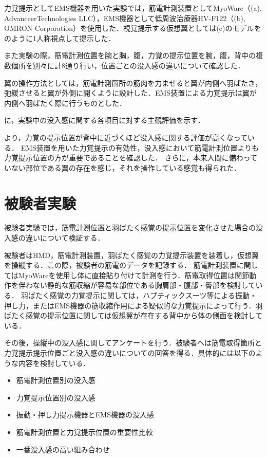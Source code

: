 
    力覚提示としてEMS機器を用いた実験では，筋電計測装置としてMyoWare（(a), AdvanceerTechnologies LLC），EMS機器として低周波治療器HV-F122（(b), OMRON Corporation）を使用した．視覚提示する仮想翼としては(c)のモデルをのように1人称視点して提示した．

    また実験の際，筋電計測位置を腕と胸，腹，力覚の提示位置を腕，腹，背中の複数個所を別々に計8通り行い，位置ごとの没入感の違いについて確認した．

    翼の操作方法としては，筋電計測箇所の筋肉を力ませると翼が内側へ羽ばたき，弛緩させると翼が外側に開くように設計した．EMS装置による力覚提示は翼が内側へ羽ばたく際に行うものとした．


    に，実験中の没入感に関する各項目に対する主観評価を示す．
    
    
    

    より，力覚の提示位置が背中に近づくほど没入感に関する評価が高くなっている．
    EMS装置を用いた力覚提示の有効性，没入感において筋電計測位置よりも力覚提示位置の方が重要であることを確認した．
    さらに，本来人間に備わっていない部位である翼の存在を感じ，それを操作している感覚も得られた．

\section{被験者実験}
    
    被験者実験では，筋電計測位置と羽ばたく感覚の提示位置を変化させた場合の没入感の違いについて検証する．
    
    被験者はHMD，筋電計測装置，羽ばたく感覚の力覚提示装置を装着し，仮想翼を操縦する．この際，被験者の筋電のデータを記録する．
    筋電計測装置に関してはMyoWareを使用し体に直接貼り付けて計測を行う．筋電取得位置は関節動作を伴わない静的な筋収縮が容易な部位である胸肩部・腹部・臀部を検討している．
    羽ばたく感覚の力覚提示に関しては，ハプティックスーツ等による振動・押し力，またはEMS機器の筋収縮作用による疑似的な力覚提示によって行う．羽ばたく感覚の提示位置に関しては仮想翼が存在する背中から体の側面を検討している．
    
    その後，操縦中の没入感に関してアンケートを行う．被験者へは筋電取得箇所と力覚提示提示位置ごと没入感の違いについての回答を得る．具体的には以下のような内容を検討している．
    \begin{itemize}
    \item 筋電計測位置別の没入感
    \item 力覚提示位置別の没入感
    \item 振動・押し力提示機器とEMS機器の没入感
    \item 筋電計測位置と力覚提示位置の重要性比較
    \item 一番没入感の高い組み合わせ
    \end{itemize}

